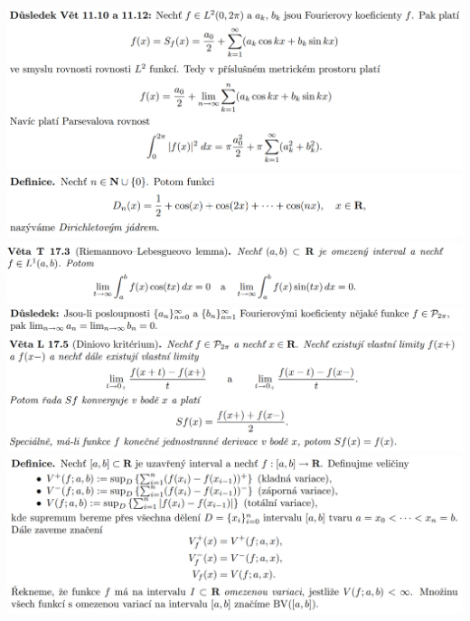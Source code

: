 \documentclass[12pt,a4paper]{article}
\begin{document}
\begin{center}
		\includegraphics[width=\textwidth]{img/4four/2020-06-21 11 44 17.png}\vspace{0.3cm}
		\includegraphics[width=\textwidth]{img/4four/2020-06-21 11 45 52.png}\vspace{0.3cm}
		\includegraphics[width=\textwidth]{img/4four/2020-06-21 11 46 20.png}\vspace{0.3cm}
		\includegraphics[width=\textwidth]{img/4four/2020-06-21 11 46 38.png}\vspace{0.3cm}
		\includegraphics[width=\textwidth]{img/4four/2020-06-21 11 47 24.png}\vspace{0.3cm}
		\includegraphics[width=\textwidth]{img/4four/2020-06-21 11 48 27.png}\vspace{0.3cm}

\end{center}
\end{document}
